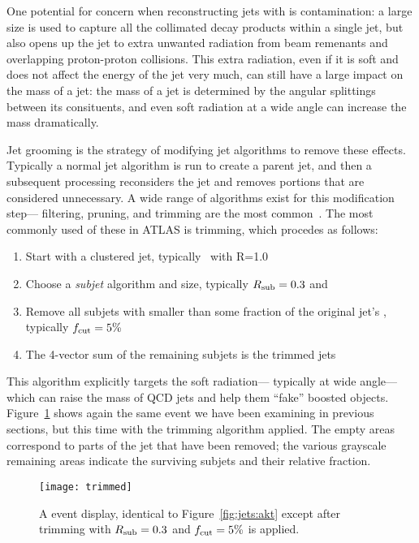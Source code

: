 One potential for concern when reconstructing jets with \largeR is contamination: a large size is used to capture all the collimated decay products within a single jet, but also opens up the jet to extra unwanted radiation from beam remenants and overlapping proton-proton collisions. This extra radiation, even if it is soft and does not affect the energy of the jet very much, can still have a large impact on the mass of a jet: the mass of a jet is determined by the angular splittings between its consituents, and even soft radiation at a wide angle can increase the mass dramatically.

Jet grooming is the strategy of modifying jet algorithms to remove these effects. Typically a normal jet algorithm is run to create a parent jet, and then a subsequent processing reconsiders the jet and removes portions that are considered unnecessary. A wide range of algorithms exist for this modification step--- filtering, pruning, and trimming are the most common~. The most commonly used of these in ATLAS is trimming, which procedes as follows:
%
\begin{enumerate}
\item Start with a clustered \largeR jet, typically \antikt\ with R=1.0
\item Choose a \textit{subjet} algorithm and size, typically $R_{\rm sub} = 0.3$ and \kt
\item Remove all subjets with \pt smaller than some fraction \fcut of the original jet's \pt, typically $f_{\rm cut}  = 5\%$
\item The 4-vector sum of the remaining subjets is the trimmed jets
\end{enumerate}
%
This algorithm explicitly targets the soft radiation--- typically at wide angle--- which can raise the mass of QCD jets and help them ``fake'' boosted objects. Figure~\ref{fig:jets:trimmed} shows again the same event we have been examining in previous sections, but this time with the trimming algorithm applied. The empty areas correspond to parts of the jet that have been removed; the various grayscale remaining areas indicate the surviving subjets and their relative \pt fraction. 



\begin{figure}
\centering
\texttt{[image: trimmed]}
\label{fig:jets:trimmed}
\caption{A event display, identical to Figure~\ref{fig:jets:akt} except after trimming with $R_{\rm sub} = 0.3$ and $f_{\rm cut} = 5\%$ is applied.}
\end{figure}

